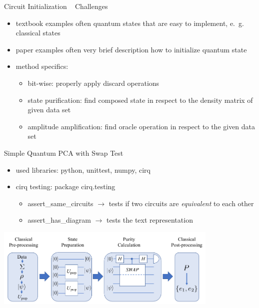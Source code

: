 \begin{frame}{Circuit Initialization ~ Challenges}
  \begin{minipage}{1.0\textwidth}
    \begin{itemize}
      \item textbook examples often quantum states that are easy to implement, e.~g. classical states
      \item paper examples often very brief description how to initialize quantum state
      \item method specifics:
      \begin{itemize}
        \item bit-wise: properly apply discard operations
        \item state purification: find composed state in respect to the density matrix of given data set
        \item amplitude amplification: find oracle operation in respect to the given data set
      \end{itemize}
    \end{itemize}
  \end{minipage}
\end{frame}


\begin{frame}{Simple Quantum PCA with Swap Test}
  \begin{minipage}{1.0\textwidth}
    \begin{itemize}
      \item used libraries: python, unittest, numpy, cirq
      \item cirq testing: package cirq.testing
      \begin{itemize}
        \item assert\_same\_circuits $\rightarrow$ tests if two circuits are \emph{equivalent} to each other
        \item assert\_has\_diagram $\rightarrow$ tests the text representation
      \end{itemize}
    \end{itemize}
  \end{minipage}
  \begin{minipage}{1.0\textwidth}
    \centering
    \includegraphics[width=0.8\textwidth]{../assets/context_algorithm_main-ref19.png}
  \end{minipage}
\end{frame}


